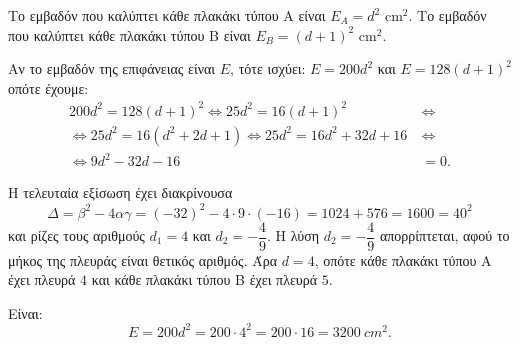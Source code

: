 
\begin{alist}
\item Το εμβαδόν που καλύπτει κάθε πλακάκι τύπου Α είναι $E_A = d^2\text{ cm}^2$.
Το εμβαδόν που καλύπτει κάθε πλακάκι τύπου Β είναι $E_B = (d + 1)^2\text{ cm}^2$.

\item
\begin{rlist}
\item Αν το εμβαδόν της επιφάνειας είναι $E$, τότε ισχύει:
$E = 200d^2$ και $E = 128(d + 1)^2$
οπότε έχουμε:
\begin{align*}
200d^2 = 128(d + 1)^2 \Leftrightarrow 25d^2 = 16(d + 1)^2 \ &\Leftrightarrow \\
\Leftrightarrow 25d^2 = 16(d^2 + 2d + 1) \Leftrightarrow 25d^2 = 16d^2 + 32d + 16 \ &\Leftrightarrow \\
\Leftrightarrow 9d^2 - 32d - 16 &= 0.
\end{align*}

Η τελευταία εξίσωση έχει διακρίνουσα
\[\Delta = \beta^2 - 4\alpha\gamma = (-32)^2 - 4 \cdot 9 \cdot (-16) = 1024 + 576 = 1600 = 40^2\]
και ρίζες τους αριθμούς $d_1 = 4$ και $d_2 = -\dfrac{4}{9}$. Η λύση $d_2 = -\dfrac{4}{9}$ απορρίπτεται, αφού το μήκος της πλευράς είναι θετικός αριθμός. Άρα $d = 4$, οπότε κάθε πλακάκι τύπου Α έχει πλευρά $4$ και κάθε πλακάκι τύπου Β έχει πλευρά $5$.

\item Είναι:
\[E = 200d^2 = 200 \cdot 4^2 = 200 \cdot 16 = \SI{3200}{cm^2}.\]
\end{rlist}
\end{alist}


